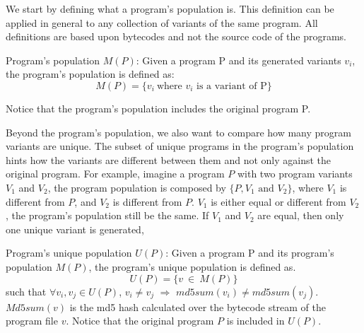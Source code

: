 We start by defining what a program's population is. This definition can be applied in general to any collection of variants of the same program. All definitions are based upon bytecodes and not the source code of the programs.

\begin{definition}{Program's population $M(P)$:}\label{def:rq1:programspopulation}
    \normalfont 
    Given a program P and its generated variants $v_i$, the program's population is defined as:\\
    $$
        M(P)=\{v_i\ \text{where $v_i$ is a variant of P}\}
    $$

    Notice that the program's population includes the original program P.
\end{definition}

Beyond the program's population, we also want to compare how many program variants are unique. The subset of unique programs in the program's population hints how the variants are different between them and not only against the original program. For example, imagine a program $P$ with two program variants $V_1$ and $V_2$, the program population is composed by $\{P, V_1 \text{ and } V_2\}$, where $V_1$ is different from $P$, and $V_2$ is different from $P$. $V_1$ is either equal or different from $V_2$, the program's population still be the same. If $V_1$ and $V_2$ are equal, then only one unique variant is generated,






\begin{definition}{Program's unique population $U(P)$:}\label{def:rq1:programsuniquepopulation}
    \normalfont 
    Given a program P and its program's population $M(P)$, the program's unique population is defined as.\\
    $$
        U(P)=\{v\ \in\ M(P)\}
    $$
    such that $\forall v_i,v_j \in U(P)$, $v_i \neq v_j$ $\Rightarrow$ $md5sum(v_i) \ne md5sum(v_j)$.
    $Md5sum(v)$ is the md5 hash calculated over the bytecode stream of the program file $v$. Notice that the original program $P$ is included in $U(P)$.

\end{definition}

